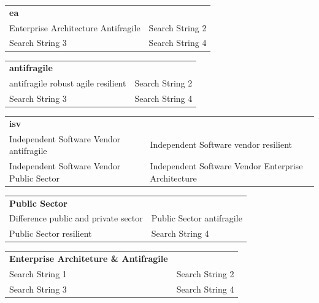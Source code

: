 	\noindent
	\begin{tabular}{p{}p{}}
		\textbf{\acrlong{ea}} & \\
		Enterprise Architecture Antifragile	&	Search String 2\\%
		Search String 3	&	Search String 4\\%
	\end{tabular}

\vspace{\baselineskip}

	\noindent
	\begin{tabular}{p{}p{}}
		\textbf{\Gls{antifragile}} & \\
		antifragile robust agile resilient	&	Search String 2\\%
		Search String 3	&	Search String 4\\%
	\end{tabular}

\vspace{\baselineskip}

	\noindent
	\begin{tabular}{p{}p{}}
		\textbf{\acrlong{isv}} & \\
		Independent Software Vendor antifragile	& Independent Software vendor resilient\\%
		Independent Software Vendor Public Sector	&	Independent Software Vendor Enterprise Architecture\\%
	\end{tabular}

\vspace{\baselineskip}

	\noindent
	\begin{tabular}{p{}p{}}
		\textbf{Public Sector} & \\
		Difference public and private sector &	Public Sector antifragile\\%
		Public Sector resilient	&	Search String 4\\%
	\end{tabular}

\vspace{\baselineskip}

	\noindent
	\begin{tabular}{p{}p{}}
		\textbf{Enterprise Architeture \& Antifragile} & \\
		Search String 1	&	Search String 2\\%
		Search String 3	&	Search String 4\\%
	\end{tabular}

